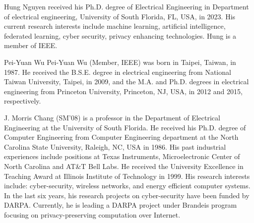 \documentclass[journal]{IEEEtai}
\begin{document}




\begin{IEEEbiography}{Hung Nguyen}
	received his Ph.D. degree of Electrical Engineering in Department of electrical engineering, University of South Florida, FL, USA, in 2023. His current research interests include machine learning, artificial intelligence, federated learning, cyber security, privacy enhancing technologies. Hung is a member of IEEE.
\end{IEEEbiography}

\begin{IEEEbiography}{Pei-Yuan Wu}
	Pei-Yuan Wu (Member, IEEE) was born in Taipei,
	Taiwan, in 1987. He received the B.S.E. degree
	in electrical engineering from National Taiwan
	University, Taipei, in 2009, and the M.A. and Ph.D.
	degrees in electrical engineering from Princeton
	University, Princeton, NJ, USA, in 2012 and 2015,
	respectively.
\end{IEEEbiography}

\begin{IEEEbiography}{J. Morris Chang}
	(SM'08) is a professor in the Department of Electrical Engineering at the University of South Florida. He received his Ph.D. degree of Computer Engineering from Computer Engineering department at the North Carolina State University, Raleigh, NC, USA in 1986. His past industrial experiences include positions at Texas Instruments, Microelectronic Center of North Carolina and AT\&T Bell Labs. He received the University Excellence in Teaching Award at Illinois Institute of Technology in 1999. His research interests include: cyber-security, wireless networks, and energy efficient computer systems. In the last six years, his research projects on cyber-security have been funded by DARPA. Currently, he is leading a DARPA project under Brandeis program focusing on privacy-preserving computation over Internet. 
\end{IEEEbiography}

%
\end{document}
